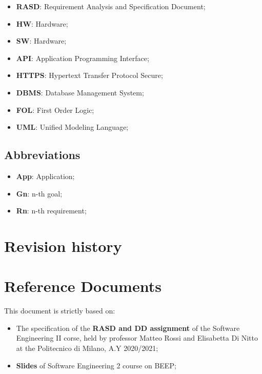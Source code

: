 \pagebreak

\begin{itemize}
\subsection{Acronyms}
\item \textbf{RASD}: Requirement Analysis and Specification Document;
\item \textbf{HW}: Hardware;
\item \textbf{SW}: Hardware;
\item \textbf{API}: Application Programming Interface;
\item \textbf{HTTPS}: Hypertext Transfer Protocol Secure;
\item \textbf{DBMS}: Database Management System;
\item \textbf{FOL}: First Order Logic;
\item \textbf{UML}: Unified Modeling Language;


\end{itemize}




\subsection{Abbreviations}
\begin{itemize}
\item \textbf{App}: Application;
\item \textbf{Gn}: n-th goal;
\item \textbf{Rn}: n-th requirement;
\end{itemize}



\section{Revision history}



\section{Reference Documents}
This document is strictly based on:
\begin{itemize}
\item The specification of the \textbf{RASD and DD assignment} of the Software Engineering II corse, held by professor Matteo Rossi and Elisabetta Di Nitto at the Politecnico di Milano, A.Y 2020/2021;
\item \textbf{Slides} of Software Engineering 2 course on BEEP;
\end{itemize}
